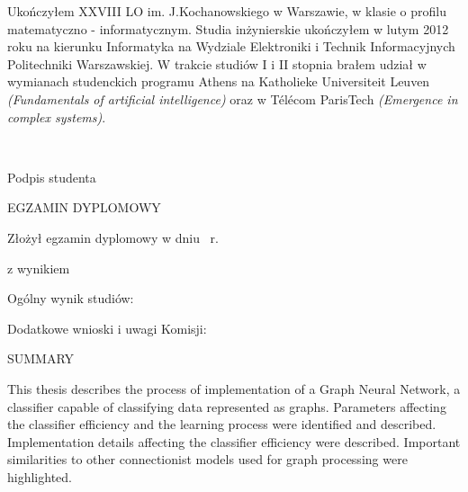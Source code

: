 \begin{titlepage}
    \noindent
	Ukończyłem XXVIII LO im. J.Kochanowskiego w Warszawie, w klasie o profilu matematyczno - informatycznym. Studia inżynierskie ukończyłem w lutym 2012 roku na kierunku Informatyka na Wydziale Elektroniki i Technik Informacyjnych Politechniki Warszawskiej. W trakcie studiów I i II stopnia brałem udział w wymianach studenckich programu Athens na Katholieke Universiteit Leuven \emph{(Fundamentals of artificial intelligence)} oraz w Télécom ParisTech \emph{(Emergence in complex systems)}.
    \par
    \vspace{2\baselineskip}
    \hfill\parbox{15em}{{\small\Dotfill}\\[-.3ex]
    \centerline{Podpis studenta}}\par
    \vspace{3\baselineskip}
 	{\noindent\MakeUppercase{Egzamin dyplomowy}} \par\bigskip\bigskip
    \par\noindent\vspace{1.5\baselineskip}
    Złożył egzamin dyplomowy w dniu ~r.
    \par\noindent\vspace{1.5\baselineskip}
    z wynikiem \Dotfill
    \par\noindent\vspace{1.5\baselineskip}
    Ogólny wynik studiów: \Dotfill
    \par\noindent\vspace{1.5\baselineskip}
    Dodatkowe wnioski i uwagi Komisji: \Dotfill
    \par\noindent\vspace{1.5\baselineskip}
    \Dotfill
    \par\noindent\vspace{1.5\baselineskip}
    \Dotfill

    \newpage\thispagestyle{empty}
    \vspace*{2\baselineskip}
    \begin{center}
	{\large \MakeUppercase{Summary}}\par\bigskip
    \end{center}

    {\noindent
	This thesis describes the process of implementation of a Graph Neural Network, a classifier capable of classifying data represented as graphs. Parameters affecting the classifier efficiency and the learning process were identified and described. Implementation details affecting the classifier efficiency were described. Important similarities to other connectionist models used for graph processing were highlighted.
	}
    \vspace*{1\baselineskip}


\end{titlepage}
